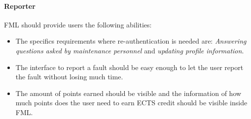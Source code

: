 \paragraph{Reporter} FML should provide users the following abilities:
\begin{itemize}
\item The specifics requirements where re-authentication is needed are: \textit{Answering questions asked by maintenance personnel}   \label{Specifics_Secure_Requirements_for_user} and \textit{updating profile information}.
\item The interface to report a fault should be easy enough to let the user report the fault without losing much time.
\item The amount of points earned should be visible and the information of how much points does the user need to earn ECTS credit should be visible inside FML.

\end{itemize}
